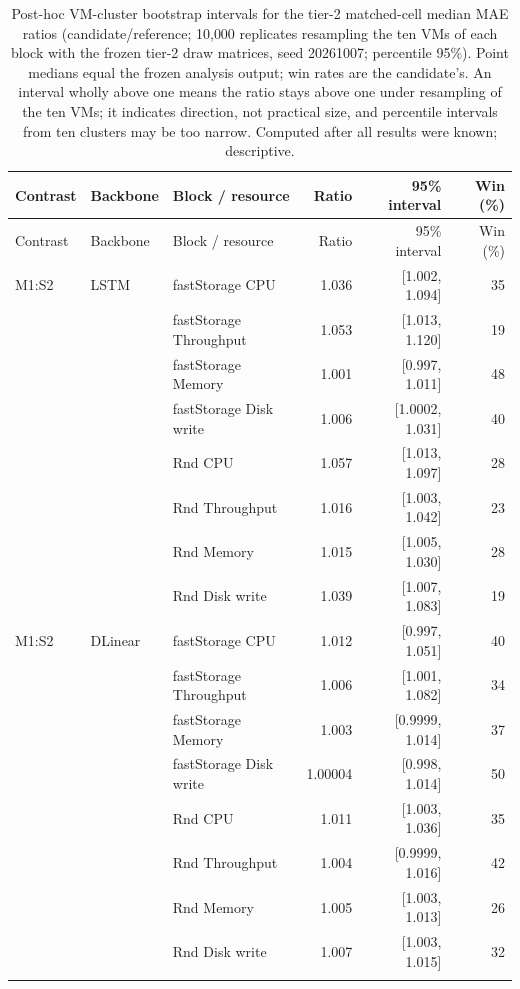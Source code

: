 \documentclass[a4paper,11pt]{article}
\begin{document}
\clearpage
\small
\begin{longtable}{@{}lllrrr@{}}
\caption{Post-hoc VM-cluster bootstrap intervals for the tier-2 matched-cell median MAE ratios (candidate/reference; 10{,}000 replicates resampling the ten VMs of each block with the frozen tier-2 draw matrices, seed 20261007; percentile 95\%). Point medians equal the frozen analysis output; win rates are the candidate's. An interval wholly above one means the ratio stays above one under resampling of the ten VMs; it indicates direction, not practical size, and percentile intervals from ten clusters may be too narrow. Computed after all results were known; descriptive.}\label{tab:supp-median-intervals}\\
\toprule
Contrast & Backbone & Block / resource & Ratio & 95\% interval & Win (\%) \\
\midrule
\endfirsthead
\toprule
Contrast & Backbone & Block / resource & Ratio & 95\% interval & Win (\%) \\
\midrule
\endhead
M1:S2 & LSTM & fastStorage CPU & 1.036 & [1.002, 1.094] & 35 \\
 &  & fastStorage Throughput & 1.053 & [1.013, 1.120] & 19 \\
 &  & fastStorage Memory & 1.001 & [0.997, 1.011] & 48 \\
 &  & fastStorage Disk write & 1.006 & [1.0002, 1.031] & 40 \\
 &  & Rnd CPU & 1.057 & [1.013, 1.097] & 28 \\
 &  & Rnd Throughput & 1.016 & [1.003, 1.042] & 23 \\
 &  & Rnd Memory & 1.015 & [1.005, 1.030] & 28 \\
 &  & Rnd Disk write & 1.039 & [1.007, 1.083] & 19 \\
\addlinespace
M1:S2 & DLinear & fastStorage CPU & 1.012 & [0.997, 1.051] & 40 \\
 &  & fastStorage Throughput & 1.006 & [1.001, 1.082] & 34 \\
 &  & fastStorage Memory & 1.003 & [0.9999, 1.014] & 37 \\
 &  & fastStorage Disk write & 1.00004 & [0.998, 1.014] & 50 \\
 &  & Rnd CPU & 1.011 & [1.003, 1.036] & 35 \\
 &  & Rnd Throughput & 1.004 & [0.9999, 1.016] & 42 \\
 &  & Rnd Memory & 1.005 & [1.003, 1.013] & 26 \\
 &  & Rnd Disk write & 1.007 & [1.003, 1.015] & 32 \\
\addlinespace

\end{longtable}
\end{document}
